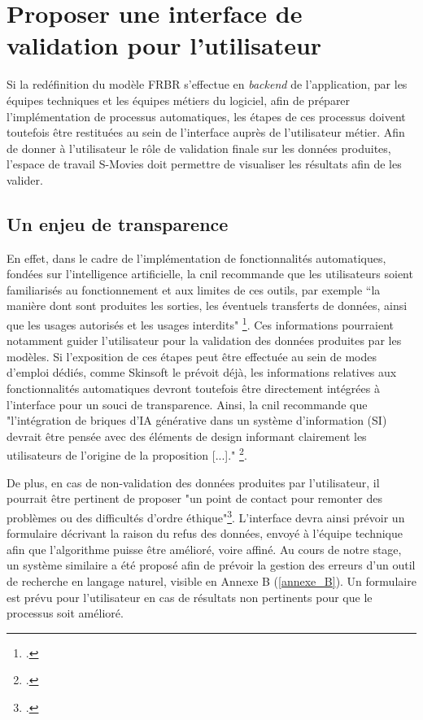 \section{\label{II_3_B}Proposer une interface de validation pour l'utilisateur} 

Si la redéfinition du modèle \gls{FRBR} s'effectue en \textit{backend} de l’application, par les équipes techniques et les équipes métiers du logiciel, afin de préparer l’implémentation de processus automatiques, les étapes de ces processus doivent toutefois être restituées au sein de l'interface auprès de l'utilisateur métier. Afin de donner à l'utilisateur le rôle de validation finale sur les données produites, l'espace de travail S-Movies doit permettre de visualiser les résultats afin de les valider. 

\subsection{Un enjeu de transparence}

En effet, dans le cadre de l'implémentation de fonctionnalités automatiques, fondées sur l'intelligence artificielle, la \gls{cnil} recommande que les utilisateurs soient familiarisés au fonctionnement et aux limites de ces outils, par exemple “la manière dont sont produites les sorties, les éventuels transferts de données, ainsi que les usages autorisés et les usages interdits" \footcite{zotero-item-729}. Ces informations pourraient notamment guider l’utilisateur pour la validation des données produites par les modèles. Si l'exposition de ces étapes peut être effectuée au sein de modes d'emploi dédiés, comme Skinsoft le prévoit déjà, les informations relatives aux fonctionnalités automatiques devront toutefois être directement intégrées à l’interface pour un souci de transparence. Ainsi, la \gls{cnil} recommande que "l’intégration de briques d’IA générative dans un système d’information (SI) devrait être pensée avec des éléments de design informant clairement les utilisateurs de l’origine de la proposition [...]." \footcite{zotero-item-729}.

De plus, en cas de non-validation des données produites par l'utilisateur, il pourrait être pertinent de proposer "un point de contact pour remonter des problèmes ou des difficultés d’ordre éthique"\footcite{zotero-item-729}. L’interface devra ainsi prévoir un formulaire décrivant la raison du refus des données, envoyé à l’équipe technique afin que l'algorithme puisse être amélioré, voire affiné. Au cours de notre stage, un système similaire a été proposé afin de prévoir la gestion des erreurs d'un outil de recherche en langage naturel, visible en Annexe B (\ref{annexe_B}). Un formulaire est prévu pour l'utilisateur en cas de résultats non pertinents pour que le processus soit amélioré.

